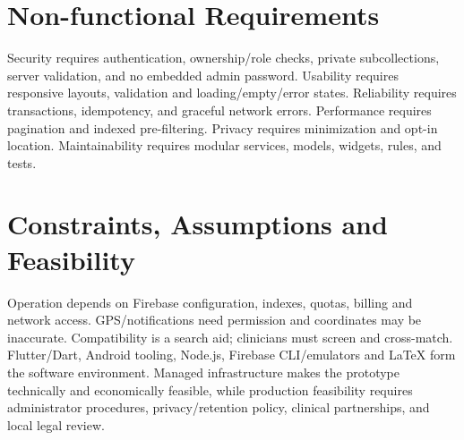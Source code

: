 \section{Non-functional Requirements}
Security requires authentication, ownership/role checks, private subcollections, server validation, and no embedded admin password. Usability requires responsive layouts, validation and loading/empty/error states. Reliability requires transactions, idempotency, and graceful network errors. Performance requires pagination and indexed pre-filtering. Privacy requires minimization and opt-in location. Maintainability requires modular services, models, widgets, rules, and tests.
\section{Constraints, Assumptions and Feasibility}
Operation depends on Firebase configuration, indexes, quotas, billing and network access. GPS/notifications need permission and coordinates may be inaccurate. Compatibility is a search aid; clinicians must screen and cross-match. Flutter/Dart, Android tooling, Node.js, Firebase CLI/emulators and LaTeX form the software environment. Managed infrastructure makes the prototype technically and economically feasible, while production feasibility requires administrator procedures, privacy/retention policy, clinical partnerships, and local legal review.

